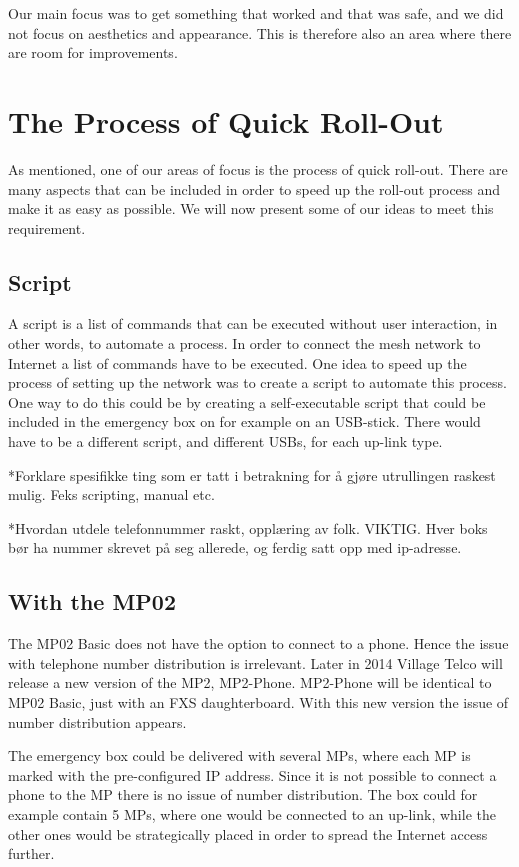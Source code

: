 Our main focus was to get something that worked and that was safe, and we did not focus on aesthetics and appearance. This is therefore also an area where there are room for improvements. 


\section{The Process of Quick Roll-Out}
As mentioned, one of our areas of focus is the process of quick roll-out. There are many aspects that can be included in order to speed up the roll-out process and make it as easy as possible. We will now present some of our ideas to meet this requirement.

\subsection{Script}
A script is a list of commands that can be executed without user interaction, in other words, to automate a process. In order to connect the mesh network to Internet a list of commands have to be executed. One idea to speed up the process of setting up the network was to create a script to automate this process. One way to do this could be by creating a self-executable script that could be included in the emergency box on for example on an USB-stick. There would have to be a different script, and different USBs, for each up-link type. 

*Forklare spesifikke ting som er tatt i betrakning for å gjøre utrullingen raskest mulig. Feks scripting, manual etc. 

*Hvordan utdele telefonnummer raskt, opplæring av folk. VIKTIG. Hver boks bør ha nummer skrevet på seg allerede, og ferdig satt opp med ip-adresse. 


\subsection{With the MP02}
The MP02 Basic does not have the option to connect to a phone. Hence the issue with telephone number distribution is irrelevant. Later in 2014 Village Telco will release a new version of the MP2, MP2-Phone. MP2-Phone will be identical to MP02 Basic, just with an FXS daughterboard. With this new version the issue of number distribution appears. 

The emergency box could be delivered with several MPs, where each MP is marked with the pre-configured IP address. Since it is not possible to connect a phone to the MP there is no issue of number distribution. The box could for example contain 5 MPs, where one would be connected to an up-link, while the other ones would be strategically placed in order to spread the Internet access further. 

